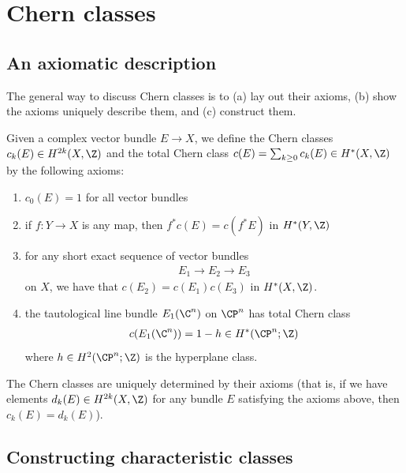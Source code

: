 \documentclass[11pt]{book}
\begin{document}
\section{Chern classes}

\subsection{An axiomatic description}

The general way to discuss Chern classes is to (a) lay out their axioms, (b) show the axioms uniquely describe them, and (c) construct them.

\begin{definition}\label{def:chern-classes} Given a complex vector bundle $E \to X$, we define the Chern classes $c_k(E) \in H^{2k}(X,\Z)$ and the total Chern class $c(E) = \sum_{k\ge0} c_k(E) \in H^\ast(X,\Z)$ by the following axioms:
\begin{enumerate}
    \item $c_0(E) = 1$ for all vector bundles
    \item if $f \colon Y \to X$ is any map, then $f^\ast c(E) = c(f^\ast E)$ in $H^\ast(Y,\Z)$
    \item for any short exact sequence of vector bundles
    \begin{align*}
        E_1 \to E_2\to E_3
    \end{align*}
    on $X$, we have that $c(E_2) = c(E_1)c(E_3)$ in $H^\ast(X,\Z)$.
    \item the tautological line bundle $E_1(\C^n)$ on $\CP^n$ has total Chern class
    \begin{align*}
        c(E_1(\C^n)) = 1 -h \in H^\ast(\CP^n;\Z)
    \end{align*}
    where $h \in H^2(\CP^n;\Z)$ is the hyperplane class.
\end{enumerate}
\end{definition}

\begin{proposition}
The Chern classes are uniquely determined by their axioms (that is, if we have elements $d_k(E) \in H^{2k}(X,\Z)$ for any bundle $E$ satisfying the axioms above, then $c_k(E) = d_k(E)$).
\end{proposition}


\subsection{Constructing characteristic classes}
\end{document}
